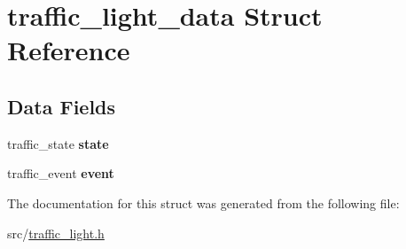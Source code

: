 \hypertarget{structtraffic__light__data}{}\section{traffic\+\_\+light\+\_\+data Struct Reference}
\label{structtraffic__light__data}
\subsection*{Data Fields}
\begin{DoxyCompactItemize}
\item 
\hypertarget{structtraffic__light__data_a68153484e80b8468dba92d3d50754ef6}{}traffic\+\_\+state {\bfseries state}\label{structtraffic__light__data_a68153484e80b8468dba92d3d50754ef6}

\item 
\hypertarget{structtraffic__light__data_a2181ff2fe01d7e779b7c394edfe2fdc7}{}traffic\+\_\+event {\bfseries event}\label{structtraffic__light__data_a2181ff2fe01d7e779b7c394edfe2fdc7}

\end{DoxyCompactItemize}


The documentation for this struct was generated from the following file\+:\begin{DoxyCompactItemize}
\item 
src/\hyperlink{traffic__light_8h}{traffic\+\_\+light.\+h}\end{DoxyCompactItemize}
